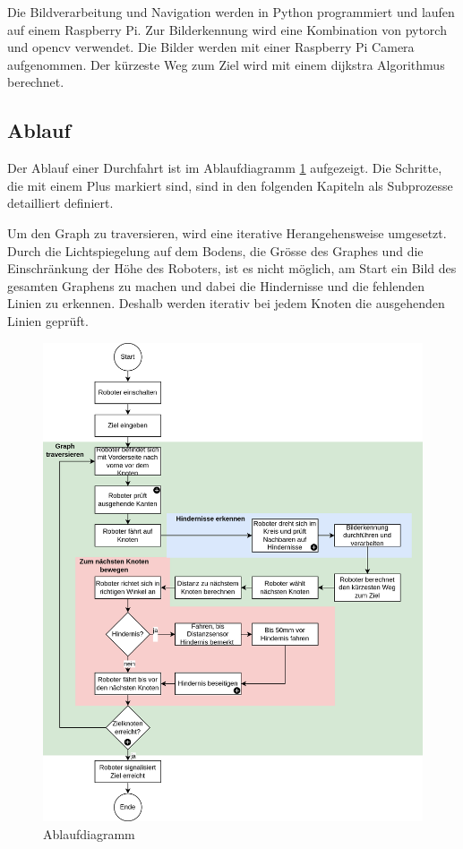 Die Bildverarbeitung und Navigation werden in Python programmiert und laufen auf einem Raspberry Pi. Zur Bilderkennung wird eine Kombination von \gls{pytorch} und \gls{opencv} verwendet. Die Bilder werden mit einer Raspberry Pi Camera aufgenommen. Der kürzeste Weg zum Ziel wird mit einem \gls{dijkstra} Algorithmus berechnet.

\subsection{Ablauf}

Der Ablauf einer Durchfahrt ist im Ablaufdiagramm \ref{fig:ablaufdiagramm} aufgezeigt.
Die Schritte, die mit einem Plus markiert sind, sind in den folgenden Kapiteln als Subprozesse detailliert definiert.

Um den Graph zu traversieren, wird eine iterative Herangehensweise umgesetzt. Durch die Lichtspiegelung auf dem Bodens, die Grösse des Graphes und die Einschränkung der Höhe des Roboters, ist es nicht möglich, am Start ein Bild des gesamten Graphens zu machen und dabei die Hindernisse und die fehlenden Linien zu erkennen. Deshalb werden iterativ bei jedem Knoten die ausgehenden Linien geprüft.

\begin{figure}[H]
\centering
\includegraphics[width=\textwidth]{assets/gesamtkonzept/ablaufdiagramm.png}
\caption{Ablaufdiagramm}
\label{fig:ablaufdiagramm}
\end{figure}

